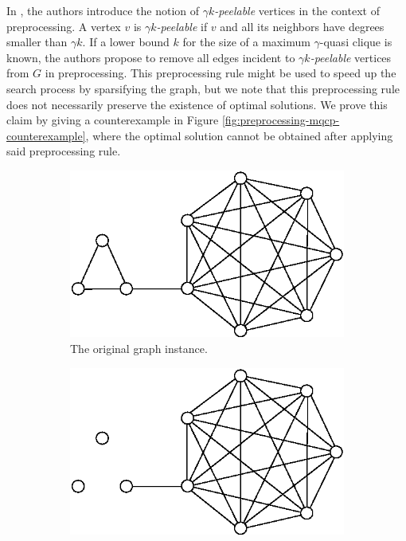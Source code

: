 \documentclass[draft,final]{vutinfth} %
\begin{document}
In \cite{Abello2002}, the authors introduce the notion of $\gamma k$\emph{-peelable} vertices in the context of preprocessing. A vertex $v$ is $\gamma k$\emph{-peelable} if $v$ and all its neighbors have degrees smaller than $\gamma k$. If a lower bound $k$ for the size of a maximum $\gamma$-quasi clique is known, the authors propose to remove all edges incident to $\gamma k$\emph{-peelable} vertices from $G$ in preprocessing. This preprocessing rule might be used to speed up the search process by sparsifying the graph, but we note that this preprocessing rule does not necessarily preserve the existence of optimal solutions. We prove this claim by giving a counterexample in Figure \ref{fig:preprocessing-mqcp-counterexample}, where the optimal solution cannot be obtained after applying said preprocessing rule. 


\begin{figure}
    \centering
    \begin{subfigure}{.5\textwidth}
      \centering
      \includegraphics[width=.9\linewidth]{graphics/preprocessing-mqcp-counterexample-1.eps}
      \caption{The original graph instance.}
      \label{fig:preprocessing-mqcp-sub1}
    \end{subfigure}%
    \begin{subfigure}{.5\textwidth}
      \centering
      \includegraphics[width=.9\linewidth]{graphics/preprocessing-mqcp-counterexample-2.eps}

\end{subfigure}
\end{figure}
\end{document}
